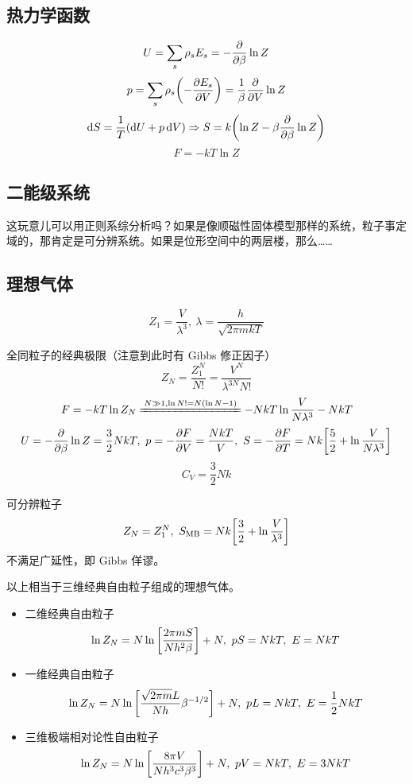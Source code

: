\subsection{热力学函数}

\[
U = \sum_s \rho_s E_s = - \pdv{\beta} \ln{Z}
\] \[
p = \sum_s \rho_s \qty(- \pdv{E_s}{V}) = \frac{1}{\beta} \pdv{V} \ln{Z}
\] \[
\dd{S} = \frac{1}{T} (\dd{U} + p \dd{V}) \Rightarrow S = k \qty(\ln{Z} - \beta \pdv{\beta} \ln{Z})
\] \[
F = - k T \ln{Z}
\]

\subsection{二能级系统}

这玩意儿可以用正则系综分析吗？如果是像顺磁性固体模型那样的系统，粒子事定域的，那肯定是可分辨系统。如果是位形空间中的两层楼，那么……

\subsection{理想气体}

\[
Z_1 = \frac{V}{\lambda^3},\ \lambda = \frac{h}{\sqrt{2 \pi m k T}}
\]

全同粒子的经典极限（注意到此时有 Gibbs 修正因子） \[
Z_N = \frac{Z_1^N}{N!} = \frac{V^N}{\lambda^{3 N} N!}
\] \[
F = - k T \ln{Z_N} \xlongequal{N \gg 1, \ln{N!} = N (\ln{N} - 1)} - N k T \ln{\frac{V}{N \lambda^3}} - N k T
\] \[
U = - \pdv{\beta} \ln{Z} = \frac{3}{2} N k T,\ p = - \pdv{F}{V} = \frac{N k T}{V},\ S = - \pdv{F}{T} = N k \qty[\frac{5}{2} + \ln{\frac{V}{N \lambda^3}}]
\] \[
C_V = \frac{3}{2} N k
\]

可分辨粒子 \[
Z_N = Z_1^N,\ S_{\text{MB}} = N k \qty[\frac{3}{2} + \ln{\frac{V}{\lambda^3}}]
\] 不满足广延性，即 Gibbs 佯谬。

\begin{framed}
    以上相当于三维经典自由粒子组成的理想气体。
    \begin{itemize}
        \item 二维经典自由粒子 \[
        \ln{Z_N} = N \ln \qty[\frac{2 \pi m S}{N h^2 \beta}] + N,\ p S = N k T,\ E = N k T
        \]
        \item 一维经典自由粒子 \[
        \ln{Z_N} = N \ln \qty[\frac{\sqrt{2 \pi m} L}{N h} \beta^{- 1 / 2}] + N,\ p L = N k T,\ E = \frac{1}{2} N k T
        \]
        \item 三维极端相对论性自由粒子 \[
        \ln{Z_N} = N \ln \qty[\frac{8 \pi V}{N h^3 c^3 \beta^3}] + N,\ p V = N k T,\ E = 3 N k T
        \]
    \end{itemize}
\end{framed}

